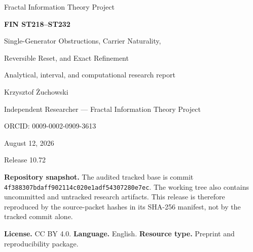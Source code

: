 \documentclass[11pt,a4paper]{article}
\begin{document}
\hypersetup{pageanchor=false}

\begin{titlepage}
\centering
\vspace*{1.2cm}
{\Large Fractal Information Theory Project\par}
\vspace{1.0cm}
{\huge\bfseries FIN ST218--ST232\par}
\vspace{0.45cm}
{\LARGE Single-Generator Obstructions, Carrier Naturality,\par}
{\LARGE Reversible Reset, and Exact Refinement\par}
\vspace{1.1cm}
{\large Analytical, interval, and computational research report\par}
\vfill
{\Large Krzysztof \.{Z}uchowski\par}
\vspace{0.2cm}
{\large Independent Researcher --- Fractal Information Theory Project\par}
{\large ORCID: 0009-0002-0909-3613\par}
\vspace{0.8cm}
{\large August 12, 2026\par}
\vspace{0.3cm}
{\large Release 10.72\par}
\vfill
\begin{minipage}{0.92\textwidth}
\small
\textbf{Repository snapshot.} The audited tracked base is commit
\texttt{4f388307bdaff902114c020e1adf54307280e7ec}. The working tree also contains
uncommitted and untracked research artifacts. This release is therefore reproduced by the
source-packet hashes in its SHA-256 manifest, not by the tracked commit alone.

\medskip
\textbf{License.} CC BY 4.0. \quad \textbf{Language.} English. \quad
\textbf{Resource type.} Preprint and reproducibility package.
\end{minipage}
\end{titlepage}
\hypersetup{pageanchor=true}
\end{document}
